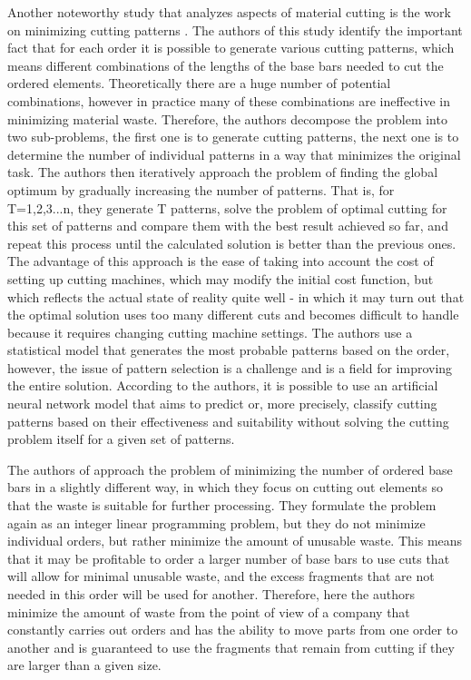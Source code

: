 Another noteworthy study that analyzes aspects of material cutting is the work on minimizing cutting patterns \cite{patterns-reduction}. The authors of this study identify the important fact that for each order it is possible to generate various cutting patterns, which means different combinations of the lengths of the base bars needed to cut the ordered elements. Theoretically there are a huge number of potential combinations, however in practice many of these combinations are ineffective in minimizing material waste. Therefore, the authors decompose the problem into two sub-problems, the first one is to generate cutting patterns, the next one is to determine the number of individual patterns in a way that minimizes the original task. The authors then iteratively approach the problem of finding the global optimum by gradually increasing the number of patterns. That is, for T=1,2,3...n, they generate T patterns, solve the problem of optimal cutting for this set of patterns and compare them with the best result achieved so far, and repeat this process until the calculated solution is better than the previous ones. The advantage of this approach is the ease of taking into account the cost of setting up cutting machines, which may modify the initial cost function, but which reflects the actual state of reality quite well - in which it may turn out that the optimal solution uses too many different cuts and becomes difficult to handle because it requires changing cutting machine settings. The authors use a statistical model that generates the most probable patterns based on the order, however, the issue of pattern selection is a challenge and is a field for improving the entire solution. According to the authors, it is possible to use an artificial neural network model that aims to predict or, more precisely, classify cutting patterns based on their effectiveness and suitability without solving the cutting problem itself for a given set of patterns.

The authors of \cite{structural-tubes} approach the problem of minimizing the number of ordered base bars in a slightly different way, in which they focus on cutting out elements so that the waste is suitable for further processing. They formulate the problem again as an integer linear programming problem, but they do not minimize individual orders, but rather minimize the amount of unusable waste. This means that it may be profitable to order a larger number of base bars to use cuts that will allow for minimal unusable waste, and the excess fragments that are not needed in this order will be used for another. Therefore, here the authors minimize the amount of waste from the point of view of a company that constantly carries out orders and has the ability to move parts from one order to another and is guaranteed to use the fragments that remain from cutting if they are larger than a given size.


